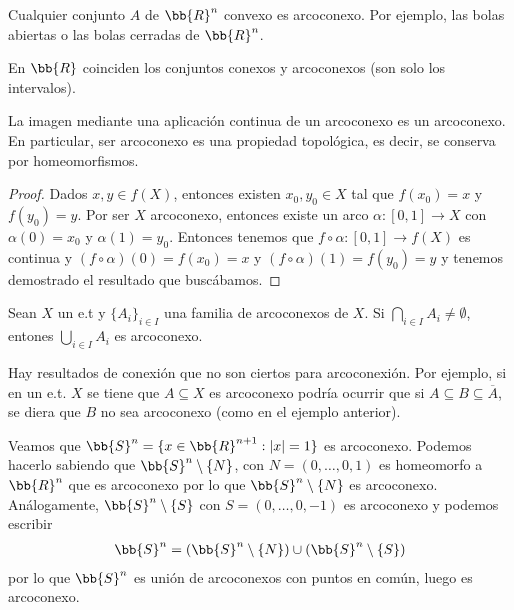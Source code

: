 \begin{coro}
    Cualquier conjunto $A$ de $\bb{R}^n$ convexo es arcoconexo. Por ejemplo, las bolas abiertas o las bolas cerradas de $\bb{R}^n$.
\end{coro}

\begin{coro}
    En $\bb{R}$ coinciden los conjuntos conexos y arcoconexos (son solo los intervalos).
\end{coro}

\begin{teo}
    La imagen mediante una aplicación continua de un arcoconexo es un arcoconexo. En particular, ser arcoconexo es una propiedad topológica, es decir, se conserva por homeomorfismos.
    \begin{proof}
        Dados $x,y\in f(X)$, entonces existen $x_0,y_0\in X$ tal que $f(x_0)=x$ y $f(y_0) = y$. Por ser $X$ arcoconexo, entonces existe un arco $\alpha:[0,1]\to X$ con $\alpha(0)=x_0$ y $\alpha(1)=y_0$. Entonces tenemos que $f\circ \alpha: [0,1]\to f(X)$ es continua y $(f\circ \alpha)(0) = f(x_0) = x$ y $(f\circ\alpha)(1) = f(y_0) = y$ y tenemos demostrado el resultado que buscábamos.
    \end{proof}
\end{teo}

\begin{teo}
    Sean $X$ un e.t y $\{A_i\}_{i\in I}$ una familia de arcoconexos de $X$. Si $\bigcap\limits_{i\in I}A_i \neq \emptyset$, entones $\bigcup\limits_{i\in I}A_i$ es arcoconexo.
\end{teo}

\begin{observacion}
    Hay resultados de conexión que no son ciertos para arcoconexión. Por ejemplo, si en un e.t. $X$ se tiene que $A\subseteq X$ es arcoconexo podría ocurrir que si $A\subseteq B \subseteq \overline{A}$, se diera que $B$ no sea arcoconexo (como en el ejemplo anterior).
\end{observacion}

\begin{ejemplo}
    Veamos que $\bb{S}^n = \{x\in \bb{R}^{n+1} : |x| = 1\}$ es arcoconexo. Podemos hacerlo sabiendo que $\bb{S}^n\setminus \{N\}$, con $N=(0,\dots,0,1)$ es homeomorfo a $\bb{R}^n$ que es arcoconexo por lo que $\bb{S}^n \setminus\{N\}$ es arcoconexo. Análogamente, $\bb{S}^n \setminus\{S\}$ con $S=(0,\dots,0,-1)$ es arcoconexo y podemos escribir
    \begin{gather*}
        \bb{S}^n = (\bb{S}^n \setminus\{N\}) \cup (\bb{S}^n \setminus\{S\})
    \end{gather*}
    por lo que $\bb{S}^n$ es unión de arcoconexos con puntos en común, luego es arcoconexo.
\end{ejemplo}

